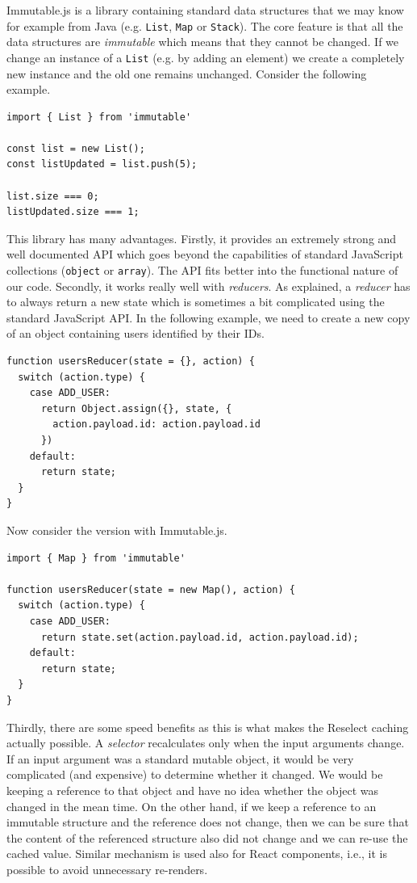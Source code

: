 Immutable.js is a library containing  standard data structures that we may know for example from Java (e.g. \texttt{List}, \texttt{Map} or \texttt{Stack}). The core feature is that all the data structures are \emph{immutable} which means that they cannot be changed. If we change an instance of a \texttt{List} (e.g. by adding an element) we create a completely new instance and the old one remains unchanged. Consider the following example.

\begin{verbatim}
import { List } from 'immutable'

const list = new List();
const listUpdated = list.push(5);

list.size === 0;
listUpdated.size === 1;
\end{verbatim}

This library has many advantages. Firstly, it provides an extremely strong and well documented API which goes beyond the capabilities of standard JavaScript collections (\texttt{object} or \texttt{array}). The API fits better into the functional nature of our code. Secondly, it works really well with \emph{reducers}. As explained, a \emph{reducer} has to always return a new state which is sometimes a bit complicated using the standard JavaScript API. In the following example, we need to create a new copy of an object containing users identified by their IDs.

\begin{verbatim}
function usersReducer(state = {}, action) {
  switch (action.type) {
    case ADD_USER: 
      return Object.assign({}, state, {
        action.payload.id: action.payload.id
      })
    default:
      return state;
  }
}
\end{verbatim}

Now consider the version with Immutable.js.

\begin{verbatim}
import { Map } from 'immutable'

function usersReducer(state = new Map(), action) {
  switch (action.type) {
    case ADD_USER: 
      return state.set(action.payload.id, action.payload.id);
    default:
      return state;
  }
}
\end{verbatim}

Thirdly, there are some speed benefits as this is what makes the Reselect caching actually possible. A \emph{selector} recalculates only when the input arguments change. If an input argument was a standard mutable object, it would be very complicated (and expensive) to determine whether it changed. We would be keeping a reference to that object and have no idea whether the object was changed in the mean time. On the other hand, if we keep a reference to an immutable structure and the reference does not change, then we can be sure that the content of the referenced structure also did not change and we can re-use the cached value. Similar mechanism is used also for React components, i.e., it is possible to avoid unnecessary re-renders.

